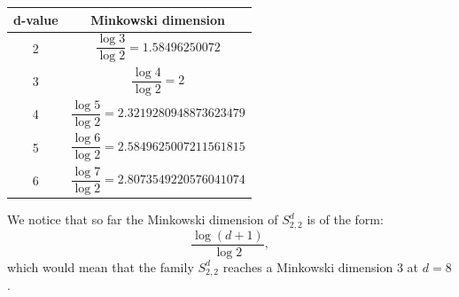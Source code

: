 \documentclass[11pt]{article}
\begin{document}
\begin{center}
\begin{tabular}{|c|c|}
\hline
d-value & Minkowski dimension\\
\hline
2 & $\dfrac{\log 3}{\log 2}=1.58496250072$\\
3 & $\dfrac{\log 4}{\log 2}=2$\\
4 & $\dfrac{\log 5}{\log 2}=2.3219280948873623479$\\
5 & $\dfrac{\log 6}{\log 2}=2.5849625007211561815$\\
6 & $\dfrac{\log 7}{\log 2}=2.8073549220576041074$\\
\hline
\end{tabular}
\end{center}

We notice that so far the Minkowski dimension of $S_{2,2}^d$ is of the form:
\[
\frac{\log(d+1)}{\log 2},
\]
which would mean that the family $S_{2,2}^d$ reaches a Minkowski dimension $3$ at $d=8$.
\end{document}
